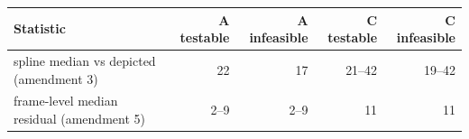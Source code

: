 \footnotesize
\begin{tabular}{lrrrr}
\toprule
Statistic & A testable & A infeasible & C testable & C infeasible \\
\midrule
spline median vs depicted (amendment 3) & 22 & 17 & 21--42 & 19--42 \\
frame-level median residual (amendment 5) & 2--9 & 2--9 & 11 & 11 \\
\bottomrule
\end{tabular}
